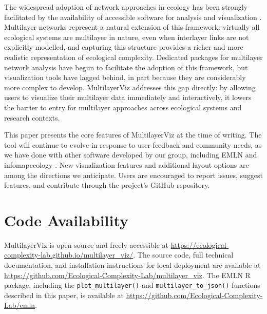 \documentclass{article}
\begin{document}
The widespread adoption of network approaches in ecology has been strongly facilitated by the availability of accessible software for analysis and visualization \cite{[REFS: bipartite and igraph]}. Multilayer networks represent a natural extension of this framework: virtually all ecological systems are multilayer in nature, even when interlayer links are not explicitly modelled, and capturing this structure provides a richer and more realistic representation of ecological complexity. Dedicated packages for multilayer network analysis \cite{De-Domenico2015-jj, Farage2021-lg,Frydman2023-qe} have begun to facilitate the adoption of this framework, but visualization tools have lagged behind, in part because they are considerably more complex to develop. MultilayerViz addresses this gap directly: by allowing users to visualize their multilayer data immediately and interactively, it lowers the barrier to entry for multilayer approaches across ecological systems and research contexts.

This paper presents the core features of MultilayerViz at the time of writing. The tool will continue to evolve in response to user feedback and community needs, as we have done with other software developed by our group, including EMLN \cite{Frydman2023-qe} and infomapecology \cite{Farage2021-lg}. New visualization features and additional layout options are among the directions we anticipate. Users are encouraged to report issues, suggest features, and contribute through the project's GitHub repository.

\section*{Code Availability}
MultilayerViz is open-source and freely accessible at \url{https://ecological-complexity-lab.github.io/multilayer\_viz/}. The source code, full technical documentation, and installation instructions for local deployment are available at \url{https://github.com/Ecological-Complexity-Lab/multilayer\_viz}. The EMLN R package, including the \texttt{plot_multilayer()} and \texttt{multilayer_to_json()} functions described in this paper, is available at \url{https://github.com/Ecological-Complexity-Lab/emln}.

\printbibliography
\end{document}
